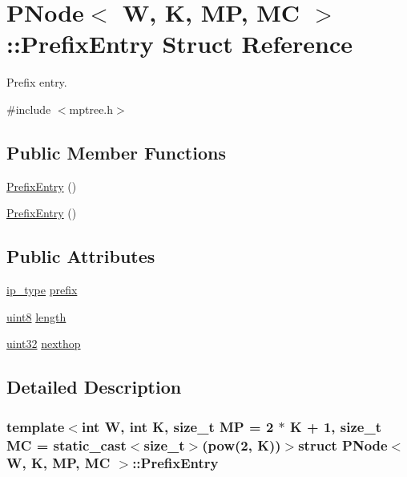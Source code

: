 \hypertarget{structPNode_1_1PrefixEntry}{\section{P\-Node$<$ W, K, M\-P, M\-C $>$\-:\-:Prefix\-Entry Struct Reference}
\label{structPNode_1_1PrefixEntry}
}


Prefix entry.  




{\ttfamily \#include $<$mptree.\-h$>$}

\subsection*{Public Member Functions}
\begin{DoxyCompactItemize}
\item 
\hyperlink{structPNode_1_1PrefixEntry_aa71abfc990d9188cb52b7ce35d787832}{Prefix\-Entry} ()
\item 
\hyperlink{structPNode_1_1PrefixEntry_aa71abfc990d9188cb52b7ce35d787832}{Prefix\-Entry} ()
\end{DoxyCompactItemize}
\subsection*{Public Attributes}
\begin{DoxyCompactItemize}
\item 
\hyperlink{structPNode_a61bb3b468d24d7a913120fffd4b4cb26}{ip\-\_\-type} \hyperlink{structPNode_1_1PrefixEntry_a1e9bf615fce09a1d84c2a41993548da8}{prefix}
\item 
\hyperlink{types_8h_a34ecedcf03a70dc91e4616212d79267d}{uint8} \hyperlink{structPNode_1_1PrefixEntry_a30104944f87b14734351ee8ce997707a}{length}
\item 
\hyperlink{types_8h_abd01e8e67e3d94cab04ecaaf4f85ac1b}{uint32} \hyperlink{structPNode_1_1PrefixEntry_a7b474c22c07ee8f34aa0a18b06716a3a}{nexthop}
\end{DoxyCompactItemize}


\subsection{Detailed Description}
\subsubsection*{template$<$int W, int K, size\-\_\-t M\-P = 2 $\ast$ K + 1, size\-\_\-t M\-C = static\-\_\-cast$<$size\-\_\-t$>$(pow(2, K))$>$struct P\-Node$<$ W, K, M\-P, M\-C $>$\-::\-Prefix\-Entry}


